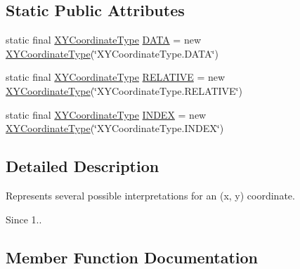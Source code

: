 \subsection*{Static Public Attributes}
\begin{DoxyCompactItemize}
\item 
static final \mbox{\hyperlink{classorg_1_1jfree_1_1chart_1_1util_1_1_x_y_coordinate_type}{X\+Y\+Coordinate\+Type}} \mbox{\hyperlink{classorg_1_1jfree_1_1chart_1_1util_1_1_x_y_coordinate_type_a2048a71fe1acd8c8ad036609ee48b2ae}{D\+A\+TA}} = new \mbox{\hyperlink{classorg_1_1jfree_1_1chart_1_1util_1_1_x_y_coordinate_type}{X\+Y\+Coordinate\+Type}}(\char`\"{}X\+Y\+Coordinate\+Type.\+D\+A\+TA\char`\"{})
\item 
static final \mbox{\hyperlink{classorg_1_1jfree_1_1chart_1_1util_1_1_x_y_coordinate_type}{X\+Y\+Coordinate\+Type}} \mbox{\hyperlink{classorg_1_1jfree_1_1chart_1_1util_1_1_x_y_coordinate_type_a725eacbcd221bcc7551ad835d2073d21}{R\+E\+L\+A\+T\+I\+VE}} = new \mbox{\hyperlink{classorg_1_1jfree_1_1chart_1_1util_1_1_x_y_coordinate_type}{X\+Y\+Coordinate\+Type}}(\char`\"{}X\+Y\+Coordinate\+Type.\+R\+E\+L\+A\+T\+I\+VE\char`\"{})
\item 
static final \mbox{\hyperlink{classorg_1_1jfree_1_1chart_1_1util_1_1_x_y_coordinate_type}{X\+Y\+Coordinate\+Type}} \mbox{\hyperlink{classorg_1_1jfree_1_1chart_1_1util_1_1_x_y_coordinate_type_a5832c6586ced976733cca3ebdf89d0f0}{I\+N\+D\+EX}} = new \mbox{\hyperlink{classorg_1_1jfree_1_1chart_1_1util_1_1_x_y_coordinate_type}{X\+Y\+Coordinate\+Type}}(\char`\"{}X\+Y\+Coordinate\+Type.\+I\+N\+D\+EX\char`\"{})
\end{DoxyCompactItemize}


\subsection{Detailed Description}
Represents several possible interpretations for an (x, y) coordinate.

\begin{DoxySince}{Since}
1.. 
\end{DoxySince}


\subsection{Member Function Documentation}
\mbox{\label{classorg_1_1jfree_1_1chart_1_1util_1_1_x_y_coordinate_type_a7584dd8d0e9b47887303cc4226671120}} 
